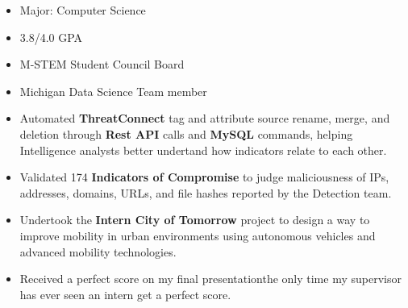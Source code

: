 \documentclass[10pt,a4paper,ragged2e]{altacv}
\begin{document}
\tagline{}

\begin{fullwidth}
\makecvheader
\end{fullwidth}



\begin{itemize}
    \item Major: Computer Science
    \smallskip
    \item 3.8/4.0 GPA
    \smallskip
    \item M-STEM Student Council Board
    \smallskip
    \item Michigan Data Science Team member
\end{itemize}



\begin{itemize}
\item Automated \textbf{ThreatConnect} tag and attribute source rename, merge, and deletion through \textbf{Rest API} calls and \textbf{MySQL} commands, helping Intelligence analysts better undertand how indicators relate to each other.
\smallskip
\item Validated 174 \textbf{Indicators of Compromise} to  judge maliciousness of IPs, addresses, domains, URLs, and file hashes reported by the Detection team.
\smallskip
\item Undertook the \textbf{Intern City of Tomorrow} project to design a way to improve mobility in urban environments using autonomous vehicles and advanced mobility technologies.
\smallskip
\item Received a perfect score on my final presentation\textemdash the only time my supervisor has ever seen an intern get a perfect score.
\end{itemize}
\end{document}
